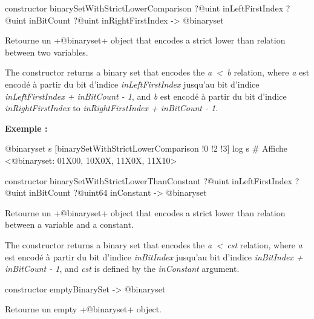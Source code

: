 \begin{galgas3box}
constructor binarySetWithStrictLowerComparison
  ?@uint inLeftFirstIndex
  ?@uint inBitCount
  ?@uint inRightFirstIndex
  -> @binaryset
\end{galgas3box}


Retourne un \ggst+@binaryset+ object that encodes a strict lower than relation between two variables.

The constructor returns a binary set that encodes the \emph{a~<~b} relation, where \emph{a} est encodé à partir du bit d'indice \emph{inLeftFirstIndex} jusqu'au bit d'indice \emph{inLeftFirstIndex  + inBitCount - 1}, and \emph{b} est encodé à partir du bit d'indice \emph{inRightFirstIndex} to \emph{inRightFirstIndex + inBitCount - 1}.

\textbf{Exemple :}
\begin{galgas3}
@binaryset s [binarySetWithStrictLowerComparison !0 !2 !3]
log s # Affiche <@binaryset: 01X00, 10X0X, 11X0X, 11X10>
\end{galgas3}





\begin{galgas3box}
constructor binarySetWithStrictLowerThanConstant
  ?@uint inLeftFirstIndex
  ?@uint inBitCount
  ?@uint64 inConstant
  -> @binaryset
\end{galgas3box}


Retourne un \ggst+@binaryset+ object that encodes a strict lower than relation between a variable and a constant.

The constructor returns a binary set that encodes the \emph{a~<~cst} relation, where \emph {a} est encodé à partir du bit d'indice \emph{inBitIndex} jusqu'au bit d'indice \emph{inBitIndex  + inBitCount - 1}, and \emph{cst} is defined by the \emph{inConstant} argument.





\begin{galgas3box}
constructor emptyBinarySet -> @binaryset
\end{galgas3box}


Retourne un empty \ggst+@binaryset+ object.






